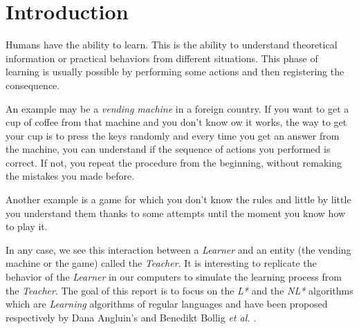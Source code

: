 \section{Introduction}
\label{sec:intro}




Humans have the ability to learn. This is the ability to understand theoretical information or practical behaviors from different situations. This phase of learning is usually possible by performing some actions and then registering the consequence.

An example may be a \textit{vending machine} in a foreign country. If you want to get a cup of coffee from that machine and you don't know ow it works, the way to get your cup is to press the keys randomly and every time you get an answer from the machine, you can understand if the sequence of actions you performed is correct. If not, you repeat the procedure from the beginning, without remaking the mistakes you made before.

Another example is a game for which you don't know the rules and little by little you understand them thanks to some attempts until the moment you know how to play it.

In any case, we see this interaction between a \textit{Learner} and an entity (the vending machine or the game) called the \textit{Teacher}. It is interesting to replicate the behavior of the \textit{Learner} in our computers to simulate the learning process from the \textit{Teacher}. The goal of this report is to focus on the \textit{L*} and the \textit{NL*} algorithms which are \textit{Learning} algorithms of regular languages and have been proposed respectively by Dana Angluin's \cite{LPaper} and Benedikt Bollig \textit{et al.} \cite{NLPaper}.

